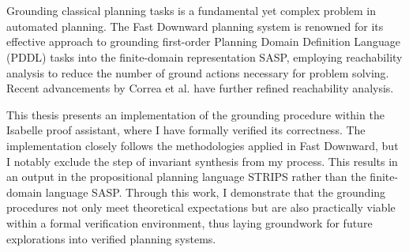 \chapter{\abstractname}

Grounding classical planning tasks is a fundamental yet complex problem in automated planning. The Fast Downward planning system is renowned for its effective approach to grounding first-order Planning Domain Definition Language (PDDL) tasks into the finite-domain representation SASP, employing reachability analysis to reduce the number of ground actions necessary for problem solving. Recent advancements by Correa et al. have further refined reachability analysis.

This thesis presents an implementation of the grounding procedure within the Isabelle proof assistant, where I have formally verified its correctness. The implementation closely follows the methodologies applied in Fast Downward, but I notably exclude the step of invariant synthesis from my process. This results in an output in the propositional planning language STRIPS rather than the finite-domain language SASP. Through this work, I demonstrate that the grounding procedures not only meet theoretical expectations but are also practically viable within a formal verification environment, thus laying groundwork for future explorations into verified planning systems.